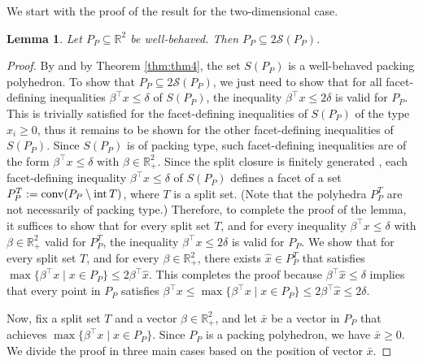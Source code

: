 \documentclass[11pt]{article}
\newcommand{\R}{\mathbb{R}}
\newcommand{\seq}{\subseteq}
\DeclareMathOperator{\conv}{conv}
\renewcommand{\S}{\mathcal{S}}
\newcommand{\bpar}{\beta}
\newtheorem{lemma}{Lemma}
\newcommand{\cred}{\color{black}}
\def\conv{\mathop{\rm conv}}
\def\int{\mathop{\rm int}}
\begin{document}
{\cred We start with the proof of the result for the two-dimensional case.}
\begin{lemma}
\label{lem:pack_2approx}
Let $P_P \subseteq \R^2$ be well-behaved. Then $P_P \seq 2 \S(P_P)$.
\end{lemma}

\begin{proof}
{\cred
By \cite{cook:ka:sc:1990} and by Theorem \ref{thm:thm4}, the set $S(P_P)$ is a well-behaved packing polyhedron.
To show that $P_P \seq 2 \S(P_P)$, we just need to show that for all facet-defining inequalities $\bpar^\top x \le \delta$ of $S(P_P)$, the inequality $\bpar^\top x \le 2  \delta$ is valid for $P_P$.
This is trivially satisfied for the facet-defining inequalities of $S(P_P)$ of the type $x_i \ge 0$, thus it remains to be shown for the other facet-defining inequalities of $S(P_P)$.
Since $S(P_P)$ is of packing type, such facet-defining inequalities are of the form $\bpar^\top x \le \delta$ with $\bpar \in \R^2_+$.
Since the split closure is finitely generated \cite{Ave12}, each facet-defining inequality $\bpar^\top x \le \delta$ of $S(P_P)$ defines a facet of a set $P_P^T := \conv(P_P \setminus \int T)$, where $T$ is a split set.
(Note that the polyhedra $P_P^T$ are not necessarily of packing type.)
Therefore, to complete the proof of the lemma, it suffices to show that for every split set $T$, and for every inequality $\bpar^\top x \le \delta$ with $\bpar \in \R^2_+$  valid for $P_P^T$, the inequality $\bpar^\top x \le 2  \delta$ is valid for $P_P$.
We show that
for every split set $T$, and for every $\bpar \in \R^2_+$, there exists $\hat x \in P_P^T$ that satisfies $\max\{\bpar^\top x \mid x \in P_P\} \le 2\bpar^\top \hat x$.
This completes the proof because $\bpar^\top \hat x \le \delta$ implies that every point in $P_P$ satisfies $\bpar^\top x \le \max\{\bpar^\top x \mid x \in P_P\} \le 2\bpar^\top \hat x \le 2 \delta$.}





{\cred Now, fix a split set $T$ and a vector} $\bpar \in \R^2_+$, and let $\bar x$ be a vector in $P_P$ that achieves $\max\{\bpar^\top x \mid x \in P_P\}$.
Since $P_P$ is a packing polyhedron, we have $\bar x \ge 0$.
We divide the proof in three main cases based on the position of vector $\bar x$.


\end{proof}
\end{document}
